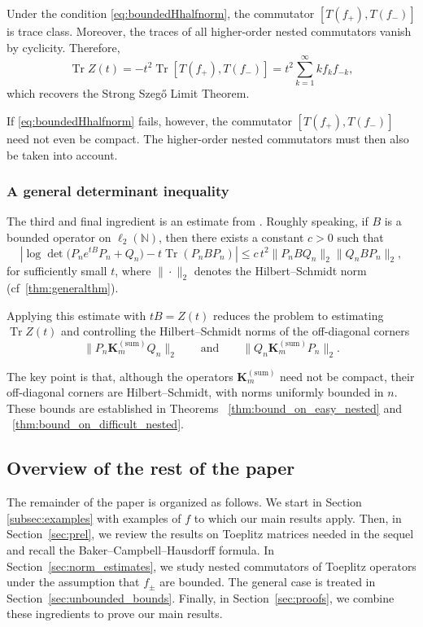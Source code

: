\documentclass[11pt]{amsart}
\theoremstyle{plain}
\theoremstyle{remark}
\DeclareMathOperator{\Tr}{Tr}
\numberwithin{equation}{section}
\begin{document}
Under the condition \eqref{eq:boundedHhalfnorm}, the commutator
$[T(f_+),T(f_-)]$ is trace class. Moreover, the traces of all higher-order
nested commutators vanish by cyclicity. Therefore,
\[
\Tr Z(t)
=
-t^2\Tr[T(f_+),T(f_-)]
=
t^2\sum_{k=1}^{\infty}k f_{k}f_{-k},
\]
which recovers the Strong Szeg\H{o} Limit Theorem.

If \eqref{eq:boundedHhalfnorm} fails, however, the commutator
$[T(f_+),T(f_-)]$ need not even be compact. The higher-order nested
commutators must then also be taken into account.

\subsubsection{A general determinant inequality}

The third and final ingredient is an estimate from \cite{BreuerDuits}.
Roughly speaking, if $B$ is a bounded operator on $\ell_2(\mathbb{N})$, then
there exists a constant $c>0$ such that
\[
\left|
\log\det\bigl(P_ne^{tB}P_n+Q_n\bigr)
-
t\Tr(P_n BP_n)
\right|
\leq
c\,
t^2\|P_nBQ_n\|_2
\|Q_nBP_n\|_2,
\]
for sufficiently small $t$, where $\|\cdot\|_2$ denotes the
Hilbert--Schmidt norm (cf~\ref{thm:generalthm}).

Applying this estimate with $tB=Z(t)$ reduces the problem to estimating
$\Tr Z(t)$ and controlling the Hilbert--Schmidt norms of the off-diagonal
corners
\[
\|P_n\mathbf{K}_m^{\mathrm{(sum)}}Q_n\|_2
\qquad\text{and}\qquad
\|Q_n\mathbf{K}_m^{\mathrm{(sum)}}P_n\|_2.
\]

The key point is that, although the operators
$\mathbf{K}_m^{\mathrm{(sum)}}$ need not be compact, their off-diagonal
corners are Hilbert--Schmidt, with norms uniformly bounded in $n$. These
bounds are established in
Theorems ~\ref{thm:bound_on_easy_nested} and
~\ref{thm:bound_on_difficult_nested}.





\subsection{Overview of the rest of the paper}


The remainder of the paper is organized as follows.  We start in Section \ref{subsec:examples} with examples of $f$ to which our main results apply. Then, in Section~\ref{sec:prel}, we review the results on Toeplitz matrices needed in the sequel and recall the Baker--Campbell--Hausdorff formula. In Section~\ref{sec:norm_estimates}, we study nested commutators of Toeplitz operators under the assumption that \(f_\pm\) are bounded. The general case is treated in Section~\ref{sec:unbounded_bounds}. Finally, in Section~\ref{sec:proofs}, we combine these ingredients to prove our main results.
\end{document}
